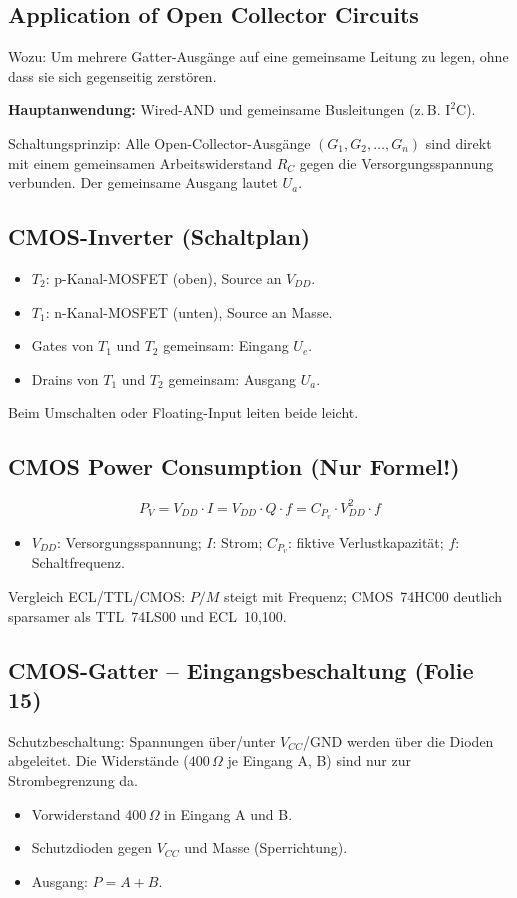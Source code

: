 \documentclass[11pt,a4paper]{article}
\begin{document}
\subsection{Application of Open Collector Circuits}
Wozu: Um mehrere Gatter-Ausgänge auf eine gemeinsame Leitung zu legen, ohne dass sie sich gegenseitig zerstören.

\textbf{Hauptanwendung:} Wired-AND und gemeinsame Busleitungen (z.\,B. $\mathrm{I^2C}$).

Schaltungsprinzip: Alle Open-Collector-Ausgänge $(G_1, G_2, \ldots, G_n)$ sind direkt mit einem gemeinsamen Arbeitswiderstand $R_C$ gegen die Versorgungsspannung verbunden. Der gemeinsame Ausgang lautet $U_a$.

\subsection{CMOS-Inverter (Schaltplan)}
\begin{itemize}
    \item $T_2$: p-Kanal-MOSFET (oben), Source an $V_{DD}$.
    \item $T_1$: n-Kanal-MOSFET (unten), Source an Masse.
    \item Gates von $T_1$ und $T_2$ gemeinsam: Eingang $U_e$.
    \item Drains von $T_1$ und $T_2$ gemeinsam: Ausgang $U_a$.
\end{itemize}
Beim Umschalten oder Floating-Input leiten beide leicht.

\subsection{CMOS Power Consumption (Nur Formel!)}
$$P_V = V_{DD} \cdot I = V_{DD} \cdot Q \cdot f = C_{P_v} \cdot V_{DD}^2 \cdot f$$
\begin{itemize}
    \item $V_{DD}$: Versorgungsspannung; $I$: Strom; $C_{P_v}$: fiktive Verlustkapazität; $f$: Schaltfrequenz.
\end{itemize}
Vergleich ECL/TTL/CMOS: $P/M$ steigt mit Frequenz; CMOS~74HC00 deutlich sparsamer als TTL~74LS00 und ECL~10,100.

\subsection{CMOS-Gatter -- Eingangsbeschaltung (Folie 15)}
Schutzbeschaltung: Spannungen über/unter $V_{CC}$/GND werden über die Dioden abgeleitet. Die Widerstände ($400\,\Omega$ je Eingang A, B) sind nur zur Strombegrenzung da.
\begin{itemize}
    \item Vorwiderstand $400\,\Omega$ in Eingang A und B.
    \item Schutzdioden gegen $V_{CC}$ und Masse (Sperrichtung).
    \item Ausgang: $P = A + B$.
\end{itemize}
\end{document}
